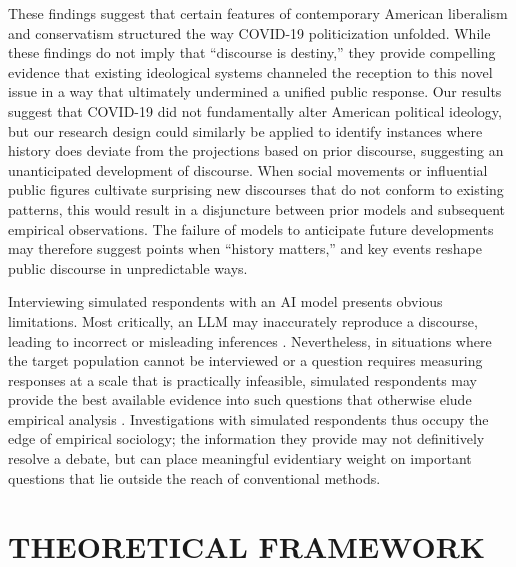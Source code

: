 \documentclass{article}
\begin{document}
These findings suggest that certain features of contemporary American
liberalism and conservatism structured the way COVID-19 politicization
unfolded. While these findings do not imply that ``discourse is
destiny,'' they provide compelling evidence that existing ideological
systems channeled the reception to this novel issue in a way that
ultimately undermined a unified public response. Our results suggest
that COVID-19 did not fundamentally alter American political ideology,
but our research design could similarly be applied to identify instances
where history does deviate from the projections based on prior
discourse, suggesting an unanticipated development of discourse. When
social movements or influential public figures cultivate surprising new
discourses that do not conform to existing patterns, this would result
in a disjuncture between prior models and subsequent empirical
observations. The failure of models to anticipate future developments
may therefore suggest points when ``history matters,'' and key events
reshape public discourse in unpredictable ways.

Interviewing simulated respondents with an AI model presents obvious
limitations. Most critically, an LLM may inaccurately reproduce a
discourse, leading to incorrect or misleading inferences
\parencite{Ji2023-ut}.
Nevertheless, in situations where the target population cannot be
interviewed or a question requires measuring responses at a scale that
is practically infeasible, simulated respondents may provide the best
available evidence into such questions that otherwise elude empirical
analysis \parencite{Kim2023-ji, Kozlowski2019-vh}. Investigations with simulated
respondents thus occupy the edge of empirical sociology; the information
they provide may not definitively resolve a debate, but can place
meaningful evidentiary weight on important questions that lie outside
the reach of conventional methods.

\section*{THEORETICAL FRAMEWORK}
\end{document}
